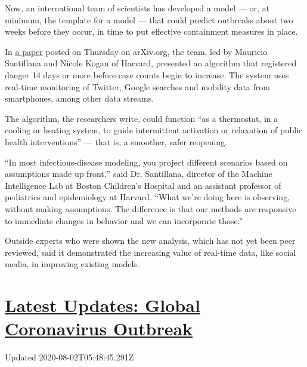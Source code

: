 Now, an international team of scientists has developed a model --- or,
at minimum, the template for a model --- that could predict outbreaks
about two weeks before they occur, in time to put effective containment
measures in place.

In \href{https://arxiv.org/abs/2007.00756}{a paper} posted on Thursday
on arXiv.org, the team, led by Mauricio Santillana and Nicole Kogan of
Harvard, presented an algorithm that registered danger 14 days or more
before case counts begin to increase. The system uses real-time
monitoring of Twitter, Google searches and mobility data from
smartphones, among other data streams.

The algorithm, the researchers write, could function ``as a thermostat,
in a cooling or heating system, to guide intermittent activation or
relaxation of public health interventions'' --- that is, a smoother,
safer reopening.

``In most infectious-disease modeling, you project different scenarios
based on assumptions made up front,'' said Dr. Santillana, director of
the Machine Intelligence Lab at Boston Children's Hospital and an
assistant professor of pediatrics and epidemiology at Harvard. ``What
we're doing here is observing, without making assumptions. The
difference is that our methods are responsive to immediate changes in
behavior and we can incorporate those.''

Outside experts who were shown the new analysis, which has not yet been
peer reviewed, said it demonstrated the increasing value of real-time
data, like social media, in improving existing models.

\hypertarget{latest-updates-global-coronavirus-outbreak}{%
\section{\texorpdfstring{\href{https://www.nytimes.com/2020/08/01/world/coronavirus-covid-19.html?action=click\&pgtype=Article\&state=default\&region=MAIN_CONTENT_1\&context=storylines_live_updates}{Latest
Updates: Global Coronavirus
Outbreak}}{Latest Updates: Global Coronavirus Outbreak}}\label{latest-updates-global-coronavirus-outbreak}}

Updated 2020-08-02T05:48:45.291Z

